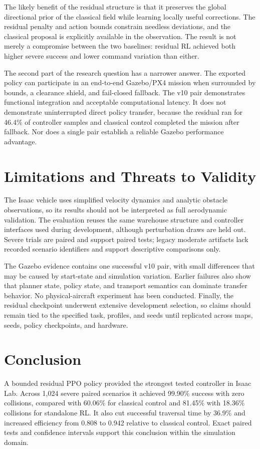 \documentclass[10pt,twocolumn]{article}
\begin{document}
The likely benefit of the residual structure is that it preserves the global directional prior of the classical field while learning locally useful corrections. The residual penalty and action bounds constrain needless deviations, and the classical proposal is explicitly available in the observation. The result is not merely a compromise between the two baselines: residual RL achieved both higher severe success and lower command variation than either.

The second part of the research question has a narrower answer. The exported policy can participate in an end-to-end Gazebo/PX4 mission when surrounded by bounds, a clearance shield, and fail-closed fallback. The v10 pair demonstrates functional integration and acceptable computational latency. It does not demonstrate uninterrupted direct policy transfer, because the residual ran for 46.4\% of controller samples and classical control completed the mission after fallback. Nor does a single pair establish a reliable Gazebo performance advantage.

\section{Limitations and Threats to Validity}
The Isaac vehicle uses simplified velocity dynamics and analytic obstacle observations, so its results should not be interpreted as full aerodynamic validation. The evaluation reuses the same warehouse structure and controller interfaces used during development, although perturbation draws are held out. Severe trials are paired and support paired tests; legacy moderate artifacts lack recorded scenario identifiers and support descriptive comparisons only.

The Gazebo evidence contains one successful v10 pair, with small differences that may be caused by start-state and simulation variation. Earlier failures also show that planner state, policy state, and transport semantics can dominate transfer behavior. No physical-aircraft experiment has been conducted. Finally, the residual checkpoint underwent extensive development selection, so claims should remain tied to the specified task, profiles, and seeds until replicated across maps, seeds, policy checkpoints, and hardware.

\section{Conclusion}
A bounded residual PPO policy provided the strongest tested controller in Isaac Lab. Across 1,024 severe paired scenarios it achieved 99.90\% success with zero collisions, compared with 60.06\% for classical control and 81.45\% with 18.36\% collisions for standalone RL. It also cut successful traversal time by 36.9\% and increased efficiency from 0.808 to 0.942 relative to classical control. Exact paired tests and confidence intervals support this conclusion within the simulation domain.
\end{document}
